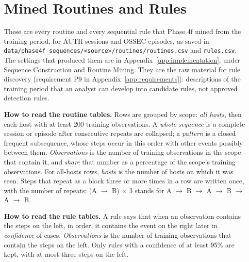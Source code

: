\documentclass[11pt,a4paper]{article}
\begin{document}
\clearpage
\section{Mined Routines and Rules}
\label{app:routines}

These are every routine and every sequential rule that Phase 4f mined from the training period, for AUTH sessions and OSSEC episodes, as saved in \nolinkurl{data/phase4f_sequences/<source>/routines/routines.csv} and \nolinkurl{rules.csv}. The settings that produced them are in Appendix~\ref{app:implementation}, under Sequence Construction and Routine Mining. They are the raw material for rule discovery (requirement P9 in Appendix~\ref{app:requirements}): descriptions of the training period that an analyst can develop into candidate rules, not approved detection rules.

\textbf{How to read the routine tables.} Rows are grouped by scope: \emph{all hosts}, then each host with at least 200 training observations. A \emph{whole sequence} is a complete session or episode after consecutive repeats are collapsed; a \emph{pattern} is a closed frequent subsequence, whose steps occur in this order with other events possibly between them. \emph{Observations} is the number of training observations in the scope that contain it, and \emph{share} that number as a percentage of the scope's training observations. For all-hosts rows, \emph{hosts} is the number of hosts on which it was seen. Steps that repeat as a block three or more times in a row are written once, with the number of repeats: (A \(\rightarrow\) B)\(\,\times\,\)3 stands for A \(\rightarrow\) B \(\rightarrow\) A \(\rightarrow\) B \(\rightarrow\) A \(\rightarrow\) B.

\textbf{How to read the rule tables.} A rule says that when an observation contains the steps on the left, in order, it contains the event on the right later in \emph{confidence} of cases. \emph{Observations} is the number of training observations that contain the steps on the left. Only rules with a confidence of at least 95\% are kept, with at most three steps on the left.
\end{document}
